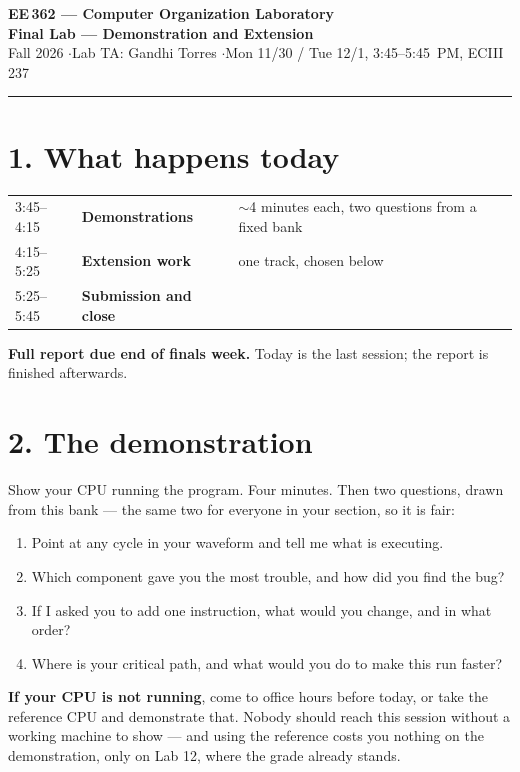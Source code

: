 \documentclass[11pt]{article}
\newcommand{\hr}{\vspace{2pt}\hrule\vspace{6pt}}
\begin{document}
\begin{center}
{\Large\bfseries EE\,362 --- Computer Organization Laboratory}\\[2pt]
{\large\bfseries Final Lab --- Demonstration and Extension}\\[4pt]
Fall 2026 \quad$\cdot$\quad Lab TA: Gandhi Torres \quad$\cdot$\quad Mon 11/30 / Tue 12/1, 3:45--5:45~PM, ECIII 237
\end{center}
\hr

\section*{1. What happens today}

\begin{center}
\begin{tabular}{lll}
\toprule
3:45--4:15 & \textbf{Demonstrations} & $\sim$4 minutes each, two questions from a fixed bank \\
4:15--5:25 & \textbf{Extension work} & one track, chosen below \\
5:25--5:45 & \textbf{Submission and close} & \\
\bottomrule
\end{tabular}
\end{center}

\textbf{Full report due end of finals week.} Today is the last session; the report
is finished afterwards.

\section*{2. The demonstration}

Show your CPU running the program. Four minutes. Then two questions, drawn from
this bank --- the same two for everyone in your section, so it is fair:

\begin{enumerate}[leftmargin=2em,itemsep=2pt]
\item Point at any cycle in your waveform and tell me what is executing.
\item Which component gave you the most trouble, and how did you find the bug?
\item If I asked you to add one instruction, what would you change, and in what
order?
\item Where is your critical path, and what would you do to make this run faster?
\end{enumerate}

\textbf{If your CPU is not running}, come to office hours before today, or take
the reference CPU and demonstrate that. Nobody should reach this session without a
working machine to show --- and using the reference costs you nothing on the
demonstration, only on Lab 12, where the grade already stands.
\end{document}
